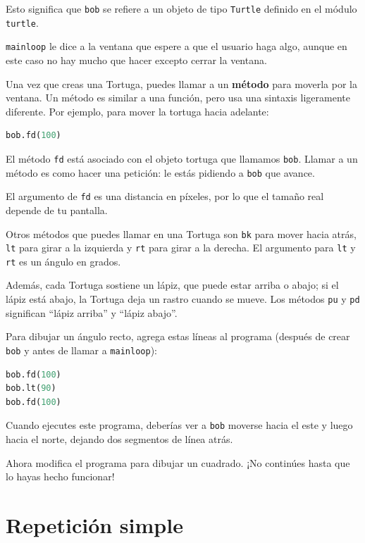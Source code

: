Esto significa que \texttt{bob} se refiere a un objeto de tipo \texttt{Turtle} definido en el módulo \texttt{turtle}.

\texttt{mainloop} le dice a la ventana que espere a que el usuario haga algo, aunque en este caso no hay mucho que hacer excepto cerrar la ventana.

Una vez que creas una Tortuga, puedes llamar a un \textbf{método} para moverla por la ventana. Un método es similar a una función, pero usa una sintaxis ligeramente diferente. Por ejemplo, para mover la tortuga hacia adelante:

\begin{lstlisting}[language=Python]
bob.fd(100)
\end{lstlisting}

El método \texttt{fd} está asociado con el objeto tortuga que llamamos \texttt{bob}. Llamar a un método es como hacer una petición: le estás pidiendo a \texttt{bob} que avance.

El argumento de \texttt{fd} es una distancia en píxeles, por lo que el tamaño real depende de tu pantalla.

Otros métodos que puedes llamar en una Tortuga son \texttt{bk} para mover hacia atrás, \texttt{lt} para girar a la izquierda y \texttt{rt} para girar a la derecha. El argumento para \texttt{lt} y \texttt{rt} es un ángulo en grados.

Además, cada Tortuga sostiene un lápiz, que puede estar arriba o abajo; si el lápiz está abajo, la Tortuga deja un rastro cuando se mueve. Los métodos \texttt{pu} y \texttt{pd} significan ``lápiz arriba'' y ``lápiz abajo''.

Para dibujar un ángulo recto, agrega estas líneas al programa (después de crear \texttt{bob} y antes de llamar a \texttt{mainloop}):

\begin{lstlisting}[language=Python]
bob.fd(100)
bob.lt(90)
bob.fd(100)
\end{lstlisting}

Cuando ejecutes este programa, deberías ver a \texttt{bob} moverse hacia el este y luego hacia el norte, dejando dos segmentos de línea atrás.

Ahora modifica el programa para dibujar un cuadrado. ¡No continúes hasta que lo hayas hecho funcionar!

\section{Repetición simple}

